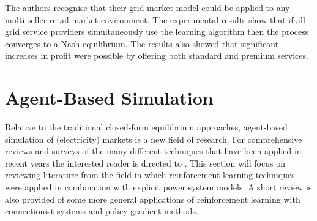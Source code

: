The authors recognise that their grid market model could be applied to any
multi-seller retail market environment.  The experimental results show that if
all grid service providers simultaneously use the learning algorithm then the
process converges to a Nash equilibrium.  The results also showed that
significant increases in profit were possible by offering both standard and
premium services.

\section{Agent-Based Simulation}
Relative to the traditional closed-form equilibrium approaches, agent-based
simulation of (electricity) markets is a new field of research.  For
comprehensive reviews and surveys of the many different techniques that have
been applied in recent years the interested reader is directed to
\cite{anke:2008,tesfatsi:handbook,visud:thesis}.  This section will focus on
reviewing literature from the field in which reinforcement learning techniques
were applied in combination with explicit power system models.  A short review
is also provided of some more general applications of reinforcement learning
with connectionist systems and policy-gradient methods.

%
%

